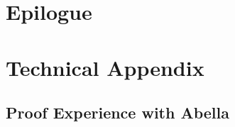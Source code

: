





\part{Epilogue}







\cleardoublepage


\part{Technical Appendix}

\appendix

\chapter{Proof Experience with Abella}


